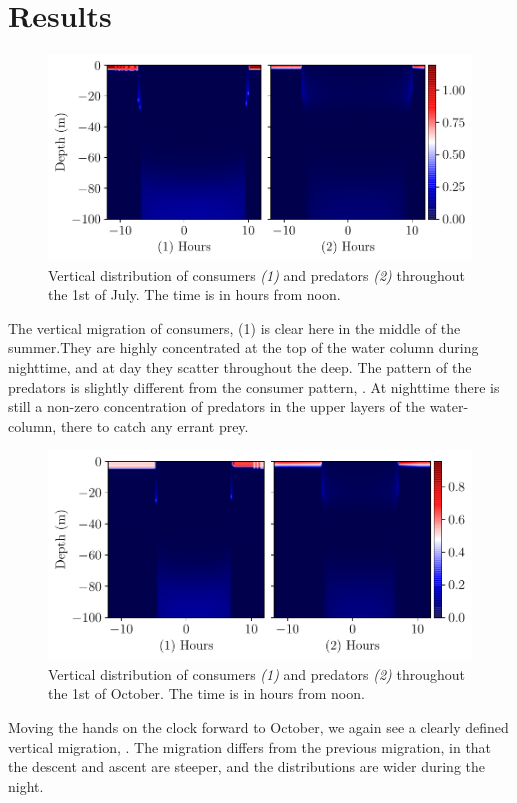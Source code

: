 \section{Results}


\begin{figure}
\includegraphics{heatmapsday90_nonrandom.pdf}
\caption{Vertical distribution of consumers \emph{(1)} and predators \emph{(2)} throughout the 1st of July. The time is in hours from noon. }
\label{fig:heatmaps_90_nonrandom}
\end{figure}
The vertical migration of consumers, (1) is clear here in the middle of the summer.They are highly concentrated at the top of the water column during nighttime, and at day they scatter throughout the deep. The pattern of the predators is slightly different from the consumer pattern, . At nighttime there is still a non-zero concentration of predators in the upper layers of the water-column, there to catch any errant prey.
\begin{figure}
\includegraphics{heatmapsday180_nonrandom.pdf}
\caption{Vertical distribution of consumers \emph{(1)} and predators \emph{(2)} throughout the 1st of October. The time is in hours from noon.}
\label{fig:heatmaps_180_nonrandom}
\end{figure}
Moving the hands on the clock forward to October, we again see a clearly defined vertical migration, . The migration differs from the previous migration, in that the descent and ascent are steeper, and the distributions are wider during the night.

